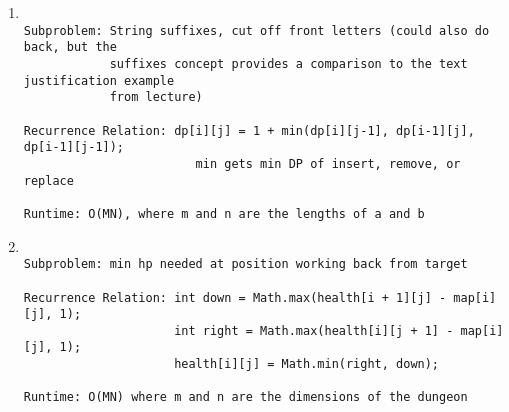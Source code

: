 \documentclass{article}
\begin{document}
\begin{enumerate}

\item
\begin{lstlisting}

Subproblem: String suffixes, cut off front letters (could also do back, but the 
            suffixes concept provides a comparison to the text justification example 
            from lecture)

Recurrence Relation: dp[i][j] = 1 + min(dp[i][j-1], dp[i-1][j], dp[i-1][j-1]); 
                        min gets min DP of insert, remove, or replace
                                       
Runtime: O(MN), where m and n are the lengths of a and b

\end{lstlisting}

\item
\begin{lstlisting}

Subproblem: min hp needed at position working back from target

Recurrence Relation: int down = Math.max(health[i + 1][j] - map[i][j], 1);
                     int right = Math.max(health[i][j + 1] - map[i][j], 1);
                     health[i][j] = Math.min(right, down);

Runtime: O(MN) where m and n are the dimensions of the dungeon

\end{lstlisting}

\end{enumerate}
\end{document}
